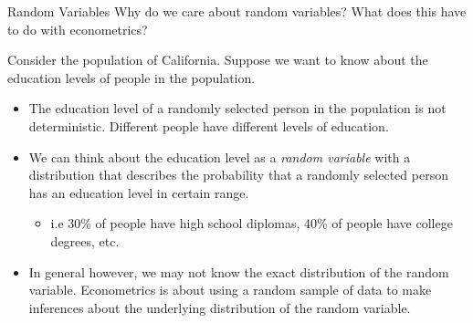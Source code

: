 \documentclass[notheorems,9pt, handout]{beamer}
\begin{document}
\begin{frame}{Random Variables} 
	\label{frame:rv-statistics}
	 Why do we care about random variables? What does this have to do with econometrics?	

	Consider the population of California. Suppose we want to know about the education levels of people in the population.
	\begin{itemize}
		\item<1-> The education level of a randomly selected person in the population is not deterministic. Different people have different levels of education. 
		\item<2-> We can think about the education level as a \emph{random variable} with a distribution that describes the probability that a randomly selected person has an education level in certain range.
		\begin{itemize}
			\item i.e 30\% of people have high school diplomas, 40\% of people have college degrees, etc. 
		\end{itemize}
		\item<3-> In general however, we may not know the exact distribution of the random variable. Econometrics is about using a random sample of data to make inferences about the underlying distribution of the random variable.
	\end{itemize}
\end{frame}
\end{document}
